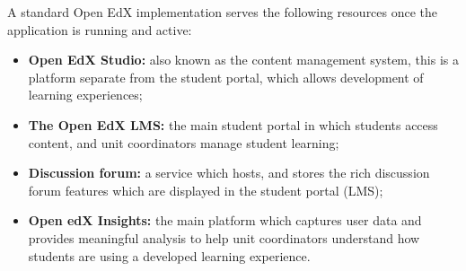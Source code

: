 \documentclass[a4paper]{article}
\begin{document}
A standard Open EdX implementation serves the following resources once the application is running and active:
\begin{itemize}
\item \textbf{Open EdX Studio:} also known as the content management system, this is a platform separate from the student portal, which allows development of learning experiences;
\item \textbf{The Open EdX LMS:} the main student portal in which students access content, and unit coordinators manage student learning;
\item \textbf{Discussion forum:} a service which hosts, and stores the rich discussion forum features which are displayed in the student portal (LMS);
\item \textbf{Open edX Insights:} the main platform which captures user data and provides meaningful analysis to help unit coordinators understand how students are using a developed learning experience.
\end{itemize}

\end{document}
